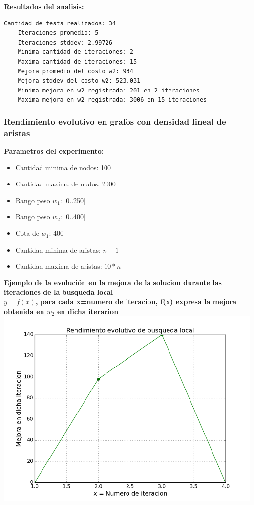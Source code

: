 \vspace{1cm}

\textbf{Resultados del analisis:}
\begin{lstlisting}[frame=single]
	Cantidad de tests realizados: 34	
	Iteraciones promedio: 5	
	Iteraciones stddev: 2.99726	
	Minima cantidad de iteraciones: 2	
	Maxima cantidad de iteraciones: 15	
	Mejora promedio del costo w2: 934	
	Mejora stddev del costo w2: 523.031	
	Minima mejora en w2 registrada: 201 en 2 iteraciones	
	Maxima mejora en w2 registrada: 3006 en 15 iteraciones	
\end{lstlisting}

\subsubsection{Rendimiento evolutivo en grafos con densidad lineal de aristas}

\textbf{Parametros del experimento:}
\begin{itemize}
	\item Cantidad minima de nodos: 100
	\item Cantidad maxima de nodos: 2000
	\item Rango peso $w_1$: [0..250]
	\item Rango peso $w_2$: [0..400]
	\item Cota de $w_1$: 400
	\item Cantidad minima de aristas: $n-1$
	\item Cantidad maxima de aristas: $10*n$
\end{itemize}  

\vspace{1cm}

\begin{center}
	\textbf{Ejemplo de la evoluci\'on en la mejora de la solucion durante las iteraciones de la busqueda local}\\
	\textbf{$y = f(x)$, para cada x=numero de iteracion, f(x) expresa la mejora obtenida en $w_2$ en dicha iteracion}\\
	\includegraphics[scale=0.7]{experimentos/bqlocal/rendimiento_evolutivo_absoluto_lineal/bqlocal/instancia_500_4999_in_iters_w2_differential.png}
\end{center}

